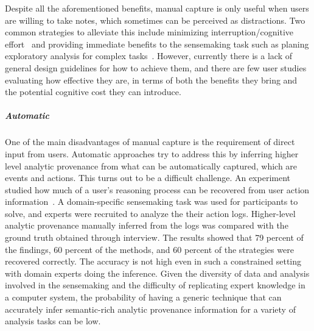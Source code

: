 Despite all the aforementioned benefits, manual capture is only useful when users are willing to take notes, which sometimes can be perceived as distractions. Two common strategies to alleviate this include minimizing interruption/cognitive effort~\cite{Hong2008} and providing immediate benefits to the sensemaking task such as planing exploratory analysis for complex tasks~\cite{Lunzer2014}. However, currently there is a lack of general design guidelines for how to achieve them, and there are few user studies evaluating how effective they are, in terms of both the benefits they bring and the potential cognitive cost they can introduce.

\subparagraph{Automatic}
One of the main disadvantages of manual capture is the requirement of direct input from users. Automatic approaches try to address this by inferring higher level analytic provenance from what can be automatically captured, which are events and actions. This turns out to be a difficult challenge. An experiment studied how much of a user's reasoning process can be recovered from user action information~\cite{Dou2009}. A domain-specific sensemaking task was used for participants to solve, and experts were recruited to analyze the their action logs. Higher-level analytic provenance manually inferred from the logs was compared with the ground truth obtained through interview. The results showed that 79 percent of the findings, 60 percent of the methods, and 60 percent of the strategies were recovered correctly. The accuracy is not high even in such a constrained setting with domain experts doing the inference. Given the diversity of data and analysis involved in the sensemaking and the difficulty of replicating expert knowledge in a computer system, the probability of having a generic technique that can accurately infer semantic-rich analytic provenance information for a variety of analysis tasks can be low.


